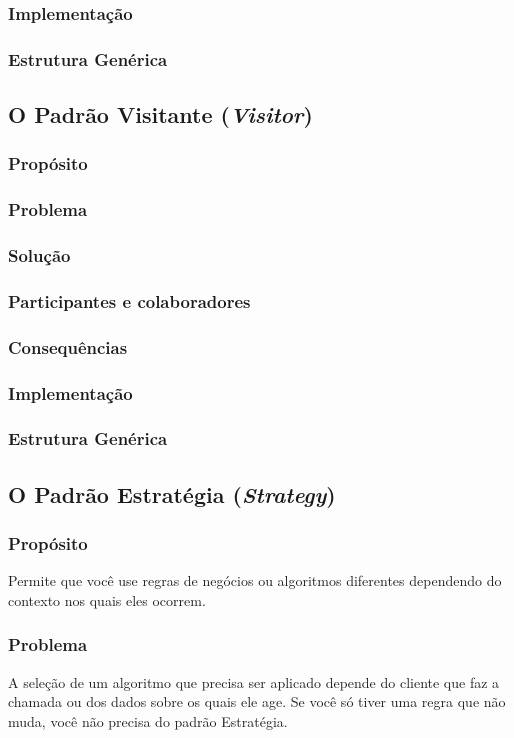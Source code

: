 \documentclass[
	11pt,				%
	openright,
	twoside,			%
	a4paper,			%
	english,			%
	french,
	brazil,				%
	sumario=tradicional
	]{abntex2}
\begin{document}
\subsubsection{Implementação}
\subsubsection{Estrutura Genérica}

\subsection{O Padrão Visitante (\textit{Visitor})}
\subsubsection{Propósito}
\subsubsection{Problema}
\subsubsection{Solução}
\subsubsection{Participantes e colaboradores}
\subsubsection{Consequências}
\subsubsection{Implementação}
\subsubsection{Estrutura Genérica}

\subsection{O Padrão Estratégia (\textit{Strategy})}
\subsubsection{Propósito}
Permite que você use regras de negócios ou algoritmos diferentes dependendo do contexto nos quais eles ocorrem.

\subsubsection{Problema}
A seleção de um algoritmo que precisa ser aplicado depende do cliente que faz a chamada ou dos dados sobre os quais ele age. Se você só tiver uma regra que não muda, você não precisa do padrão Estratégia.
\end{document}
